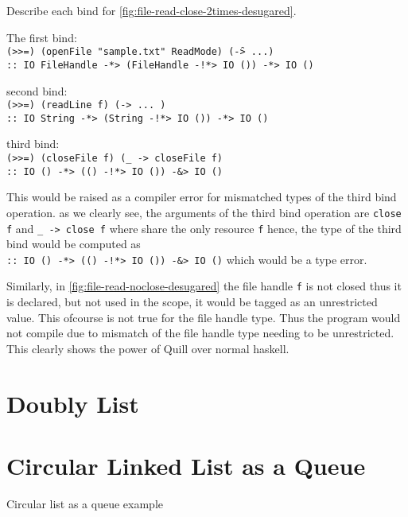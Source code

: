 Describe each bind for \cref{fig:file-read-close-2times-desugared}.

The first bind:\\
\texttt{(>>=) (openFile "sample.txt" ReadMode) (\f -> ...)}\\
\texttt{:: IO FileHandle -*> (FileHandle -!*> IO ()) -*> IO ()}

second bind:\\
\texttt{(>>=) (readLine f) (\s -> ... )}\\
\texttt{:: IO String -*> (String -!*> IO ()) -*> IO ()}

third bind:\\
\texttt{(>>=) (closeFile f) (\_ -> closeFile f)}\\
\texttt{:: IO () -*> (() -!*> IO ()) -&> IO ()}

This would be raised as a compiler error for mismatched types of the third bind operation.
as we clearly see, the arguments of the third bind operation are \texttt{close f}
and \texttt{\_ -> close f} where share the only resource \texttt{f} hence,
the type of the third bind would be computed as \\
\texttt{:: IO () -*> (() -!*> IO ()) -&> IO ()} which would be a type error.

Similarly, in \cref{fig:file-read-noclose-desugared} the file handle \texttt{f} is not closed thus it is declared, but not used
in the scope, it would be tagged as an unrestricted value. This ofcourse is not true for the file handle type. Thus
the program would not compile due to mismatch of the file handle type needing to be unrestricted. This clearly shows
the power of Quill over normal haskell.

\section{Doubly List}\label{sec:dll-example}
\section{Circular Linked List as a Queue}\label{sec:queue-example}



Circular list as a queue example


